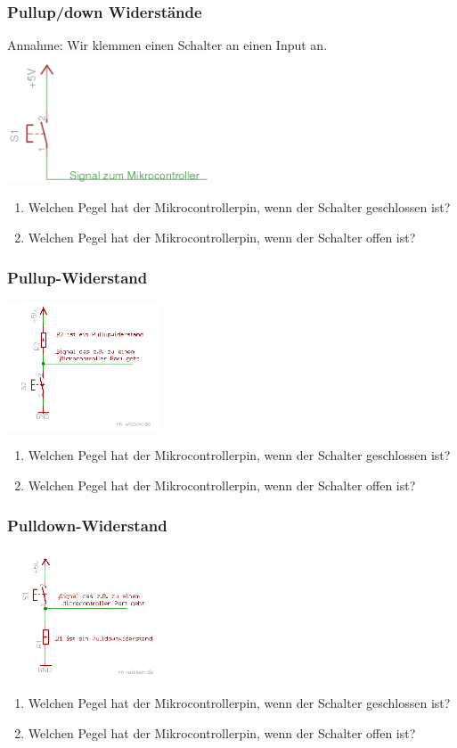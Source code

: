 \documentclass[ngerman,compress]{beamer}
\begin{document}
\begin{frame}
	\frametitle{Pullup/down Widerstände}
	Annahme: Wir klemmen einen Schalter an einen Input an.
	\includegraphics[height=1.5in]{keinpullupdown.png}
	\begin{enumerate}
		\item Welchen Pegel hat der Mikrocontrollerpin, wenn der Schalter geschlossen ist?
		\item Welchen Pegel hat der Mikrocontrollerpin, wenn der Schalter offen ist?
	\end{enumerate}
\end{frame}

\begin{frame}
	\frametitle{Pullup-Widerstand}
	\includegraphics[height=1.5in]{Pullup.png}
	\begin{enumerate}
		\item Welchen Pegel hat der Mikrocontrollerpin, wenn der Schalter geschlossen ist?
		\item Welchen Pegel hat der Mikrocontrollerpin, wenn der Schalter offen ist?
	\end{enumerate}
\end{frame}

\begin{frame}
	\frametitle{Pulldown-Widerstand}
	\includegraphics[height=1.5in]{Pulldown.png}
	\begin{enumerate}
		\item Welchen Pegel hat der Mikrocontrollerpin, wenn der Schalter geschlossen ist?
		\item Welchen Pegel hat der Mikrocontrollerpin, wenn der Schalter offen ist?
	\end{enumerate}
\end{frame}
\end{document}
